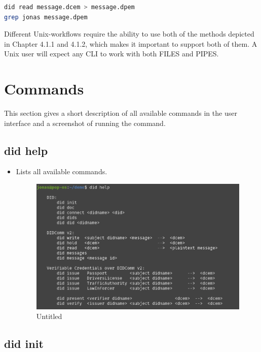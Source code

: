 \begin{lstlisting}[language=bash]
did read message.dcem > message.dpem
grep jonas message.dpem
\end{lstlisting}

Different Unix-workflows require the ability to use both of the methods
depicted in Chapter 4.1.1 and 4.1.2, which makes it important to support
both of them. A Unix user will expect any CLI to work with both FILES
and PIPES.

\hypertarget{commands}{%
\section{Commands}\label{commands}}

This section gives a short description of all available commands in the
user interface and a screenshot of running the command.

\hypertarget{did-help}{%
\subsection{did help}\label{did-help}}

\begin{itemize}
\item
  Lists all available commands.

  \begin{figure}
  \centering
  \includegraphics{User Interface f8759a9462b24d5f95cf6123d68b89ea/Untitled.png}
  \caption{Untitled}
  \end{figure}
\end{itemize}

\hypertarget{did-init}{%
\subsection{did init}\label{did-init}}

